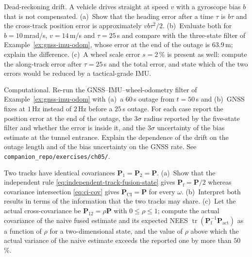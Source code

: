 \documentclass[graybox,envcountchap]{style/SNmono}
\DeclareMathOperator{\tr}{tr}
\newcommand{\repopath}[1]{\texttt{#1}}
\begin{document}
\begin{prob}\label{prob:ch05:3}
Dead-reckoning drift. A vehicle drives straight at speed $v$ with a gyroscope bias $b$ that is not compensated. (a)~Show that the heading error after a time $\tau$ is $b\tau$ and the cross-track position error is approximately $vb\tau^{2}/2$. (b)~Evaluate both for $b=10$\,mrad/s, $v=14$\,m/s and $\tau=25$\,s and compare with the three-state filter of Example~\ref{ex:gnss-imu-odom}, whose error at the end of the outage is $63.9$\,m; explain the difference. (c)~A wheel scale error $s=2$\,\% is present as well: compute the along-track error after $\tau=25$\,s and the total error, and state which of the two errors would be reduced by a tactical-grade IMU.
\end{prob}

\begin{prob}\label{prob:ch05:4}
Computational. Re-run the GNSS--IMU--wheel-odometry filter of Example~\ref{ex:gnss-imu-odom} with (a)~a $60$\,s outage from $t=50$\,s and (b)~GNSS fixes at $1$\,Hz instead of $2$\,Hz before a $25$\,s outage. For each case report the position error at the end of the outage, the $3\sigma$ radius reported by the five-state filter and whether the error is inside it, and the $3\sigma$ uncertainty of the bias estimate at the tunnel entrance. Explain the dependence of the drift on the outage length and of the bias uncertainty on the GNSS rate. See \repopath{companion\_\allowbreak repo/\allowbreak exercises/\allowbreak ch05/\allowbreak }.
\end{prob}

\begin{prob}\label{prob:ch05:5}
Two tracks have identical covariances $\mathbf{P}_{1}=\mathbf{P}_{2}=\mathbf{P}$. (a)~Show that the independent rule \eqref{eq:independent-track-fusion-state} gives $\mathbf{P}_{\mathrm{f}}=\mathbf{P}/2$ whereas covariance intersection \eqref{eq:ci-cov} gives $\mathbf{P}_{\mathrm{CI}}=\mathbf{P}$ for every $\omega$. (b)~Interpret both results in terms of the information that the two tracks may share. (c)~Let the actual cross-covariance be $\mathbf{P}_{12}=\rho\mathbf{P}$ with $0\le\rho\le1$; compute the actual covariance of the naive fused estimate and its expected NEES $\tr(\mathbf{P}_{\mathrm{f}}^{-1}\mathbf{P}_{\mathrm{act}})$ as a function of $\rho$ for a two-dimensional state, and the value of $\rho$ above which the actual variance of the naive estimate exceeds the reported one by more than $50$\,\%.
\end{prob}
\end{document}
